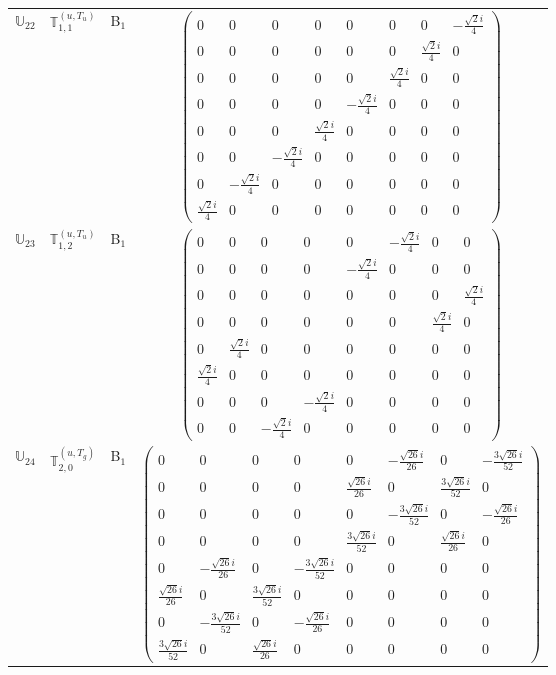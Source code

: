 \documentclass[fleqn,10pt,landscape]{article}
\begin{document}
\begin{itemize}
\begin{center}
\begin{longtable}{c|c|c|c}
$ \mathbb{U}_{22} $ & $\mathbb{T}_{1,1}^{(u,T_{u})}$ & B$_{1}$ & $\begin{pmatrix} 0 & 0 & 0 & 0 & 0 & 0 & 0 & - \frac{\sqrt{2} i}{4} \\ 0 & 0 & 0 & 0 & 0 & 0 & \frac{\sqrt{2} i}{4} & 0 \\ 0 & 0 & 0 & 0 & 0 & \frac{\sqrt{2} i}{4} & 0 & 0 \\ 0 & 0 & 0 & 0 & - \frac{\sqrt{2} i}{4} & 0 & 0 & 0 \\ 0 & 0 & 0 & \frac{\sqrt{2} i}{4} & 0 & 0 & 0 & 0 \\ 0 & 0 & - \frac{\sqrt{2} i}{4} & 0 & 0 & 0 & 0 & 0 \\ 0 & - \frac{\sqrt{2} i}{4} & 0 & 0 & 0 & 0 & 0 & 0 \\ \frac{\sqrt{2} i}{4} & 0 & 0 & 0 & 0 & 0 & 0 & 0 \end{pmatrix}$ \\
$ \mathbb{U}_{23} $ & $\mathbb{T}_{1,2}^{(u,T_{u})}$ & B$_{1}$ & $\begin{pmatrix} 0 & 0 & 0 & 0 & 0 & - \frac{\sqrt{2} i}{4} & 0 & 0 \\ 0 & 0 & 0 & 0 & - \frac{\sqrt{2} i}{4} & 0 & 0 & 0 \\ 0 & 0 & 0 & 0 & 0 & 0 & 0 & \frac{\sqrt{2} i}{4} \\ 0 & 0 & 0 & 0 & 0 & 0 & \frac{\sqrt{2} i}{4} & 0 \\ 0 & \frac{\sqrt{2} i}{4} & 0 & 0 & 0 & 0 & 0 & 0 \\ \frac{\sqrt{2} i}{4} & 0 & 0 & 0 & 0 & 0 & 0 & 0 \\ 0 & 0 & 0 & - \frac{\sqrt{2} i}{4} & 0 & 0 & 0 & 0 \\ 0 & 0 & - \frac{\sqrt{2} i}{4} & 0 & 0 & 0 & 0 & 0 \end{pmatrix}$ \\
$ \mathbb{U}_{24} $ & $\mathbb{T}_{2,0}^{(u,T_{g})}$ & B$_{1}$ & $\begin{pmatrix} 0 & 0 & 0 & 0 & 0 & - \frac{\sqrt{26} i}{26} & 0 & - \frac{3 \sqrt{26} i}{52} \\ 0 & 0 & 0 & 0 & \frac{\sqrt{26} i}{26} & 0 & \frac{3 \sqrt{26} i}{52} & 0 \\ 0 & 0 & 0 & 0 & 0 & - \frac{3 \sqrt{26} i}{52} & 0 & - \frac{\sqrt{26} i}{26} \\ 0 & 0 & 0 & 0 & \frac{3 \sqrt{26} i}{52} & 0 & \frac{\sqrt{26} i}{26} & 0 \\ 0 & - \frac{\sqrt{26} i}{26} & 0 & - \frac{3 \sqrt{26} i}{52} & 0 & 0 & 0 & 0 \\ \frac{\sqrt{26} i}{26} & 0 & \frac{3 \sqrt{26} i}{52} & 0 & 0 & 0 & 0 & 0 \\ 0 & - \frac{3 \sqrt{26} i}{52} & 0 & - \frac{\sqrt{26} i}{26} & 0 & 0 & 0 & 0 \\ \frac{3 \sqrt{26} i}{52} & 0 & \frac{\sqrt{26} i}{26} & 0 & 0 & 0 & 0 & 0 \end{pmatrix}$ \\

\end{longtable}
\end{center}
\end{itemize}
\end{document}
